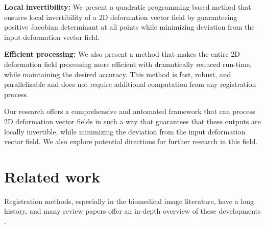 \documentclass[lettersize,journal]{IEEEtran}
\begin{document}

\textbf{Local invertibility:} We present a quadratic programming based method that ensures local invertibility of a 2D deformation vector field by guaranteeing positive Jacobian determinant at all points while minimizing deviation from the input deformation vector field.

\textbf{Efficient processing:} We also present a  method that makes the entire 2D deformation field processing more efficient with dramatically reduced run-time, while maintaining the desired accuracy. This method is fast, robust, and parallelizable and does not require additional computation from any registration process.  

Our research offers a comprehensive and automated framework that can process 2D deformation vector fields in such a way that guarantees that these outputs are locally invertible, while minimizing the deviation from the input deformation vector field. We also explore potential directions for further research in this field. 


\section{Related work}
\label{sec:related_work}

Registration methods, especially in the biomedical image literature, have a long history, and many review papers offer an in-depth overview of these developments \cite{KLEIN2009786}. 
\end{document}
